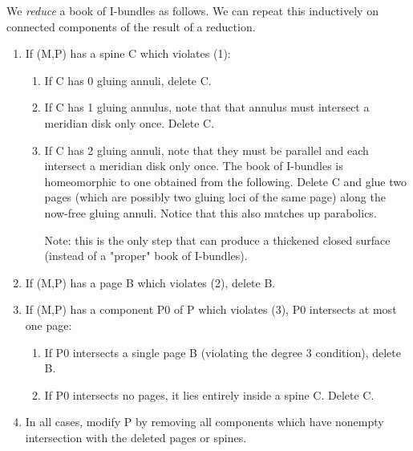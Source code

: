 \begin{defn}

We \emph{reduce} a book of I-bundles as follows. We can repeat this inductively
on connected components of the result of a reduction.

\begin{enumerate}

\item If (M,P) has a spine C which violates (1):

\begin{enumerate}

\item If C has 0 gluing annuli, delete C.

\item If C has 1 gluing annulus, note that that annulus must intersect
a meridian disk only once. Delete C.

\item If C has 2 gluing annuli, note that they must be parallel and each
intersect a meridian disk only once. The book of I-bundles is homeomorphic to
one obtained from the following. Delete C and glue two pages (which are
possibly two gluing loci of the same page) along the now-free gluing annuli.
Notice that this also matches up parabolics.

Note: this is the only step that can produce a thickened closed surface
(instead of a "proper" book of I-bundles).

\end{enumerate}

\item If (M,P) has a page B which violates (2), delete B.

\item If (M,P) has a component P0 of P which violates (3), P0 intersects at
most one page:

\begin{enumerate}

\item If P0 intersects a single page B (violating the degree 3 condition),
delete B.

\item If P0 intersects no pages, it lies entirely inside a spine C. Delete C.

\end{enumerate}

\item In all cases, modify P by removing all components which have nonempty
intersection with the deleted pages or spines.

\end{enumerate}

\end{defn}

